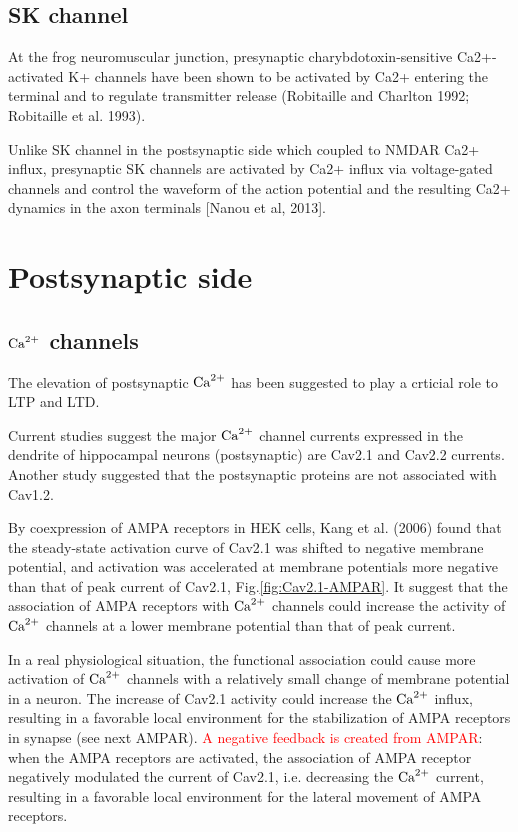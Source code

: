 \subsection{SK channel}

At the frog neuromuscular junction, presynaptic charybdotoxin-sensitive
Ca2+-activated K+ channels have been shown to be activated by Ca2+ entering the
terminal and to regulate transmitter release (Robitaille and Charlton 1992;
Robitaille et al. 1993).


Unlike SK channel in the postsynaptic side which coupled to NMDAR Ca2+ influx,
presynaptic SK channels are activated by Ca2+ influx via voltage-gated channels
and control the waveform of the action potential and the resulting Ca2+ dynamics
in the axon terminals [Nanou et al, 2013].




\section{Postsynaptic side}
\label{sec:postsynaptic-side-structure}

\subsection{${\text{Ca}^{2+}}$ channels}

The elevation of postsynaptic ${\text{Ca}^{2+}}$ has been suggested to play a crticial role
to LTP and LTD.

Current studies suggest the major ${\text{Ca}^{2+}}$ channel currents expressed in the
dendrite of hippocampal neurons (postsynaptic) are Cav2.1 and Cav2.2 currents.
Another study suggested that the postsynaptic proteins are not associated with
Cav1.2.

By coexpression of AMPA receptors in HEK cells, Kang et al. (2006) found that
the steady-state activation curve of Cav2.1 was shifted to negative membrane
potential, and activation was accelerated at membrane potentials more negative
than that of peak current of Cav2.1, Fig.\ref{fig:Cav2.1-AMPAR}.
It suggest that the association of AMPA receptors with ${\text{Ca}^{2+}}$ channels could
increase the activity of ${\text{Ca}^{2+}}$ channels at a lower membrane potential than that
of peak current.

In a real physiological situation, the functional association could cause more
activation of ${\text{Ca}^{2+}}$ channels with a relatively small change of membrane
potential in a neuron.
The increase of Cav2.1 activity could increase the ${\text{Ca}^{2+}}$ influx, resulting in a
favorable local environment for the stabilization of AMPA receptors in synapse
(see next AMPAR). \textcolor{red}{A negative feedback is created from AMPAR}:
when the AMPA receptors are activated, the association of AMPA receptor
negatively modulated the current of Cav2.1, i.e. decreasing the ${\text{Ca}^{2+}}$ current,
resulting in a favorable local environment for the lateral movement of AMPA
receptors.

